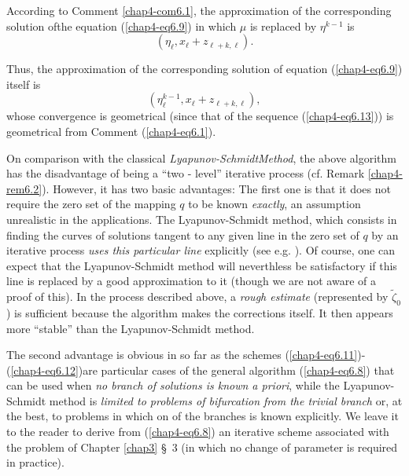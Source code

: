 According to Comment \ref{chap4-com6.1}, the approximation of the
corresponding solution of\pageoriginale the equation
(\ref{chap4-eq6.9}) in which $\mu$ is replaced by $\eta^{k-1}$ is 
\begin{equation*}
(\eta_{\ell}, x_{\ell} + z_{\ell + k, \ell}).\tag{6.13}\label{chap4-eq6.13}
\end{equation*}

Thus, the approximation of the corresponding solution of equation
(\ref{chap4-eq6.9}) itself is
$$
(\eta_{\ell}^{k-1}, x_{\ell} + z_{\ell + k , \ell}),
$$
whose convergence is geometrical (since that of the sequence
(\ref{chap4-eq6.13})) is geometrical from Comment (\ref{chap4-eq6.1}).

\begin{remark}\label{chap4-rem6.4}
On comparison with the classical {\em Lyapunov-Schmidt\break Method}, the
above algorithm has the disadvantage of being a ``two - level''
iterative process (cf. Remark \ref{chap4-rem6.2}). However, it has two
basic advantages: The first one is that it does not require the zero
set of the mapping $q$ to be known {\em exactly}, an assumption
unrealistic in the applications. The Lyapunov-Schmidt method, which
consists in finding the curves of solutions tangent to any given line
in the zero set of $q$ by an iterative process {\em uses this particular
line} explicitly (see e.g. \cite{2}). Of course, one can expect that the
Lyapunov-Schmidt method will neverthless be satisfactory if this line
is replaced by a good approximation to it (though we are not aware of
a proof of this). In the process described above, a {\em rough
  estimate} (represented by $\widetilde{\zeta}_{0}$) is sufficient
because the algorithm makes the corrections itself. It then appears
more ``stable'' than the Lyapunov-Schmidt method.

The second advantage is obvious in so far as the schemes
(\ref{chap4-eq6.11})-(\ref{chap4-eq6.12})\pageoriginale are particular
cases of the 
general algorithm (\ref{chap4-eq6.8}) that can be used when {\em no
  branch of solutions is known a priori}, while the Lyapunov-Schmidt 
  method is {\em limited to problems of bifurcation from the trivial
    branch} or, at the best, to problems in which on of the branches
  is known explicitly. We leave it to the reader to derive from
  (\ref{chap4-eq6.8}) an iterative scheme associated with the problem
  of Chapter \ref{chap3} \S\ 3 (in which no change of parameter is
  required in practice).
\end{remark}
